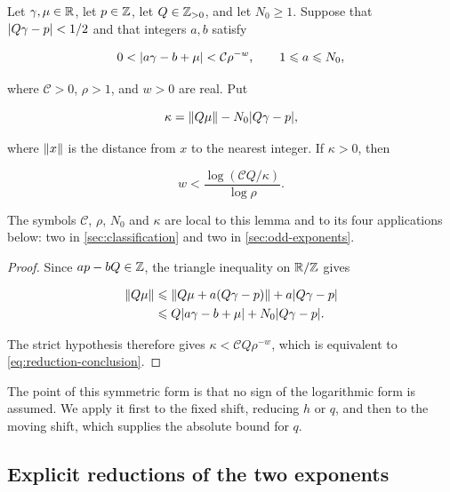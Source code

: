 \begin{lemma}
\label{lem:absolute-reduction}
Let $\gamma,\mu\in\mathbb{R}$, let $p\in\mathbb{Z}$, let $Q\in\mathbb{Z}_{>0}$, and let
$N_0\geqslant1$. Suppose that $\lvert Q\gamma-p\rvert<1/2$ and that integers
$a,b$ satisfy

\begin{equation}
 0<\lvert a\gamma-b+\mu\rvert<\mathcal C\rho^{-w},
 \qquad
 1\leqslant a\leqslant N_0,
 \label{eq:reduction-hypothesis}
\end{equation}

where $\mathcal C>0$, $\rho>1$, and $w>0$ are real. Put

\begin{equation}
 \kappa=\left\lVert Q\mu\right\rVert-N_0\lvert Q\gamma-p\rvert,
 \label{eq:kappa}
\end{equation}

where $\left\lVert x\right\rVert$ is the distance from $x$ to the nearest integer. If
$\kappa>0$, then

\begin{equation}
 w<\frac{\log(\mathcal CQ/\kappa)}{\log\rho}.
 \label{eq:reduction-conclusion}
\end{equation}

The symbols $\mathcal C$, $\rho$, $N_0$ and $\kappa$ are local to this lemma
and to its four applications below: two in \cref{sec:classification} and two
in \cref{sec:odd-exponents}.
\end{lemma}

\begin{proof}
Since $ap-bQ\in\mathbb{Z}$, the triangle inequality on $\mathbb{R}/\mathbb{Z}$ gives

\begin{align}
 \left\lVert Q\mu\right\rVert
 &\leqslant
 \left\lVert Q\mu+a(Q\gamma-p)\right\rVert+a\lvert Q\gamma-p\rvert\notag\\
 &\leqslant
 Q\lvert a\gamma-b+\mu\rvert+N_0\lvert Q\gamma-p\rvert.
\end{align}

The strict hypothesis therefore gives $\kappa<\mathcal CQ\rho^{-w}$, which
is equivalent to \cref{eq:reduction-conclusion}.
\end{proof}

The point of this symmetric form is that no sign of the logarithmic form is
assumed. We apply it first to the fixed shift, reducing $h$ or $q$, and then
to the moving shift, which supplies the absolute bound for $q$.

\subsection{Explicit reductions of the two exponents}

